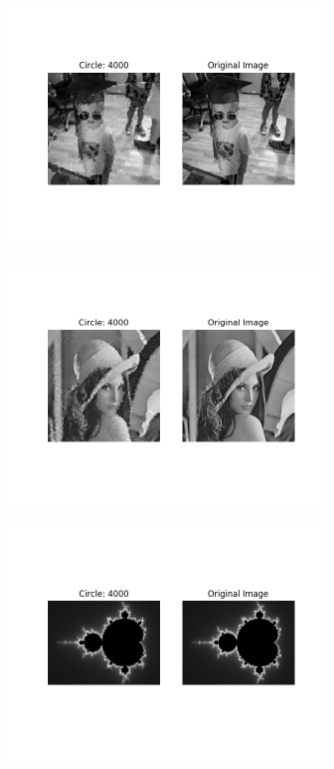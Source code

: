 \documentclass[12pt]{article}
\begin{document}
\begin{figure}[H]
\centering
\noindent\includegraphics[width=0.75\textwidth]{../results/k/k_4000}
\end{figure}
\begin{figure}[H]
\centering
\noindent\includegraphics[width=0.75\textwidth]{../results/lenna/lenna_4000}
\end{figure}
\begin{figure}[H]
\centering
\noindent\includegraphics[width=0.75\textwidth]{../results/mandlebrot/mandlebrot_4000}
\end{figure}
\end{document}
